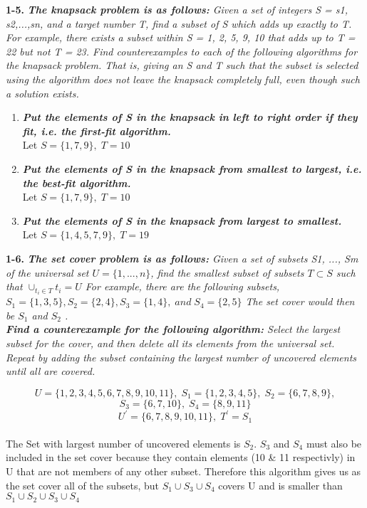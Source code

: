 \textbf{1-5.} \emph{\textbf{The knapsack problem is as follows:} Given a set of integers S = {s1, s2,...,sn},
and a target number T, find a subset of S which adds up exactly to T. For example,
there exists a subset within S = {1, 2, 5, 9, 10} that adds up to T = 22 but not
T = 23.
Find counterexamples to each of the following algorithms for the knapsack problem.
That is, giving an S and T such that the subset is selected using the algorithm does
not leave the knapsack completely full, even though such a solution exists.}
	
\begin{enumerate}[label=(\alph*)]
\itemsep1pt\parskip0pt
	\item{\emph{\textbf{Put the elements of S in the knapsack in left to right order if they fit, i.e. the first-fit algorithm.}} \\
		Let $S = \{1,7,9\}, \; T = 10$
	}
	\item{\emph{\textbf{Put the elements of S in the knapsack from smallest to largest, i.e. the best-fit algorithm.}} \\
		Let $S = \{1,7,9\}, \; T = 10$
	}
	\item{\emph{\textbf{Put the elements of S in the knapsack from largest to smallest.}} \\
		Let $S = \{1,4,5,7,9\}, \; T = 19$
	}
\end{enumerate}


\textbf{1-6.} \emph{\textbf{The set cover problem is as follows: } Given a set of subsets S1, ..., Sm of the universal set 
	$U = \{1, ..., n\}$, 
	find the smallest subset of subsets 
	$T \subset S$ 
	such that  
	$\cup_{t_{i} \in T}t_{i} = U$ For example, there are the following subsets, $S_{1} = \{1, 3, 5\}, S_{2} = \{2, 4\}, S_{3} = \{1, 4\}, \; and \; S_{4} = \{2, 5\}$ The set cover would then be $S_{1}$ and $S_{2}$ . } \\

\emph{\textbf{Find a counterexample for the following algorithm:} Select the largest subset for the cover, and then delete all its elements from the universal set. Repeat by adding the subset containing the largest number of uncovered elements until all are covered.}

\begin{center}
	$$U = \{1,2,3,4,5,6,7,8,9,10,11\}, \; S_{1} = \{1,2,3,4,5\}, \; S_{2} = \{6,7,8,9\}, $$
    $$S_{3} = \{6,7,10\}, \; S_{4} = \{8,9,11\}$$ 
	$$U^{'} = \{6,7,8,9,10,11\}, \; T^{'} = S_{1}$$ \\
	The Set with largest number of uncovered elements is $S_{2}$. $S_{3}$ and $S_{4}$ must also be included in the set cover because they contain elements (10 \& 11 respectivly)
	in U that are not members of any other subset. Therefore this algorithm gives us as the set cover all of the subsets, but $S_{1} \cup S_{3} \cup S_{4}$ covers U and is smaller
	than $S_{1} \cup S_{2} \cup S_{3} \cup S_{4}$
\end{center}


